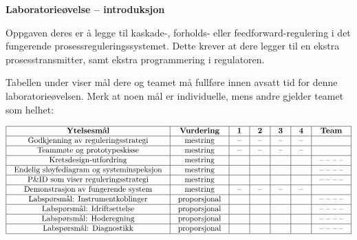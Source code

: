 

\noindent
{\bf Laboratorieøvelse -- introduksjon}

\vskip 5pt

Oppgaven deres er å legge til kaskade-, forholds- eller feedforward-regulering i det fungerende prosessreguleringssystemet. Dette krever at dere legger til en ekstra prosesstransmitter, samt ekstra programmering i regulatoren.

Tabellen under viser mål dere og teamet må fullføre innen avsatt tid for denne laboratorieøvelsen. Merk at noen mål er individuelle, mens andre gjelder teamet som helhet:



$$\vbox{\offinterlineskip
\halign{\strut
\vrule \quad\hfil # \ \hfil & 
\vrule \quad\hfil # \ \hfil & 
\vrule \quad\hfil # \ \hfil & 
\vrule \quad\hfil # \ \hfil & 
\vrule \quad\hfil # \ \hfil & 
\vrule \quad\hfil # \ \hfil & 
\vrule \quad\hfil # \ \hfil \vrule \cr
\noalign{\hrule}
%
{\bf Ytelsesmål} & {\bf Vurdering} & {\bf 1} & {\bf 2} & {\bf 3} & {\bf 4} & {\bf Team} \cr
%
\noalign{\hrule}
%
Godkjenning av reguleringsstrategi & mestring & -- & -- & -- & -- & \cr
%
\noalign{\hrule}
%
Teammøte og prototypeskisse & mestring & -- & -- & -- & -- & \cr
%
\noalign{\hrule}
%
Kretsdesign-utfordring & mestring & & & & & -- -- -- -- \cr
%
\noalign{\hrule}
%
Endelig sløyfediagram og systeminspeksjon & mestring & & & & & -- -- -- -- \cr
%
\noalign{\hrule}
%
P\&ID som viser reguleringsstrategi & mestring & & & & & -- -- -- -- \cr
%
\noalign{\hrule}
%
Demonstrasjon av fungerende system & mestring & -- & -- & -- & -- & \cr
%
\noalign{\hrule}
%
Labspørsmål: Instrumentkoblinger & proporsjonal &  &  &  &  & -- -- -- -- \cr
%
\noalign{\hrule}
%
Labspørsmål: Idriftsettelse & proporsjonal &  &  &  &  & -- -- -- -- \cr
%
\noalign{\hrule}
%
Labspørsmål: Hoderegning & proporsjonal &  &  &  &  & -- -- -- -- \cr
%
\noalign{\hrule}
%
Labspørsmål: Diagnostikk & proporsjonal &  &  &  &  & -- -- -- -- \cr
%
\noalign{\hrule}
} %
}$$ %


